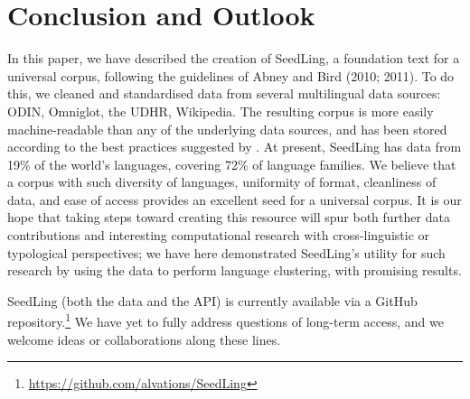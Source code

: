 \section{Conclusion and Outlook} \label{sec:conclusion}

In this paper, we have described the creation of SeedLing, a foundation text for a universal corpus, following the guidelines of Abney and Bird (2010; 2011). To do this, we cleaned and standardised data from several multilingual data sources: ODIN, Omniglot, the UDHR, Wikipedia. The resulting corpus is more easily machine-readable than any of the underlying data sources, and has been stored according to the best practices suggested by . At present, SeedLing has data from 19\% of the world's languages, covering 72\% of language families. We believe that a corpus with such diversity of languages, uniformity of format, cleanliness of data, and ease of access provides an excellent seed for a universal corpus. It is our hope that taking steps toward creating this resource will spur both further data contributions and interesting computational research with cross-linguistic or typological perspectives; we have here demonstrated SeedLing's utility for such research by using the data to perform language clustering, with promising results.

SeedLing (both the data and the API) is currently available via a GitHub repository.\footnote{\url{https://github.com/alvations/SeedLing}} We have yet to fully address questions of long-term access, and we welcome ideas or collaborations along these lines.
